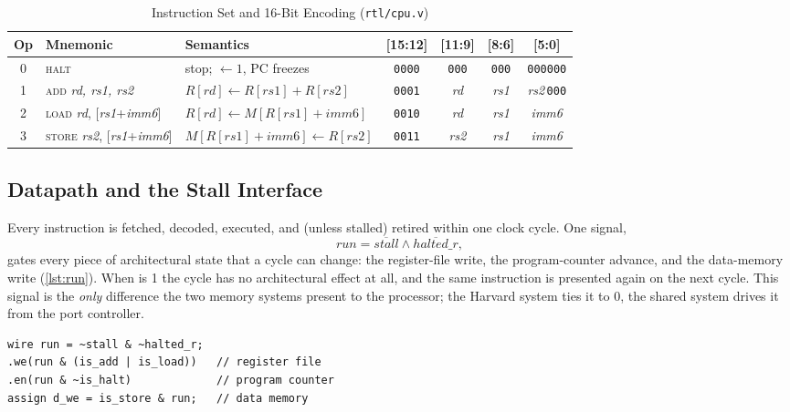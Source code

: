 \documentclass[conference]{IEEEtran}
\newcommand{\sig}[1]{\texttt{\detokenize{#1}}}
\begin{document}
\begin{table}[t]
\centering
\caption{Instruction Set and 16-Bit Encoding (\texttt{rtl/cpu.v})}
\label{tab:isa}
\footnotesize
\begin{tabular}{@{}c l l c c c c@{}}
\toprule
Op & Mnemonic & Semantics & [15:12] & [11:9] & [8:6] & [5:0] \\
\midrule
0 & \textsc{halt} & stop; \sig{halted} $\leftarrow 1$, PC freezes & \texttt{0000} & \texttt{000} & \texttt{000} & \texttt{000000} \\
1 & \textsc{add} \emph{rd, rs1, rs2} & $R[rd] \leftarrow R[rs1] + R[rs2]$ & \texttt{0001} & \emph{rd} & \emph{rs1} & \emph{rs2}\,\texttt{000} \\
2 & \textsc{load} \emph{rd}, [\emph{rs1}+\emph{imm6}] & $R[rd] \leftarrow M[R[rs1]+imm6]$ & \texttt{0010} & \emph{rd} & \emph{rs1} & \emph{imm6} \\
3 & \textsc{store} \emph{rs2}, [\emph{rs1}+\emph{imm6}] & $M[R[rs1]+imm6] \leftarrow R[rs2]$ & \texttt{0011} & \emph{rs2} & \emph{rs1} & \emph{imm6} \\
\bottomrule
\end{tabular}
\end{table}

\subsection{Datapath and the Stall Interface}
Every instruction is fetched, decoded, executed, and (unless stalled) retired within one clock
cycle. One signal,
\begin{equation}
  \mathit{run} = \overline{\mathit{stall}} \wedge \overline{\mathit{halted\_r}},
  \label{eq:run}
\end{equation}
gates every piece of architectural state that a cycle can change: the register-file write, the
program-counter advance, and the data-memory write (\cref{lst:run}). When \sig{stall} is 1 the
cycle has no architectural effect at all, and the same instruction is presented again on the next
cycle. This signal is the \emph{only} difference the two memory systems present to the processor;
the Harvard system ties it to 0, the shared system drives it from the port controller.

\begin{lstlisting}[caption={Stall gating, verbatim from \texttt{rtl/cpu.v}.},label={lst:run},float=t]
wire run = ~stall & ~halted_r;
.we(run & (is_add | is_load))   // register file
.en(run & ~is_halt)             // program counter
assign d_we = is_store & run;   // data memory
\end{lstlisting}
\end{document}
